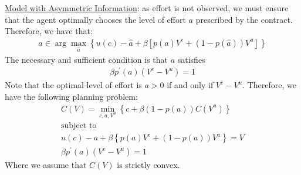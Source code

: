 \documentclass{article}
\begin{document}
\vspace{2.5mm}
\par \underline{Model with Asymmetric Information}: as effort is not observed, we must ensure that the agent optimally chooses the level of effort $a$ prescribed by the contract. Therefore, we have that:
\begin{gather*}
    a \in \arg \max_{\widehat{a}} \left\{ u(c) - \widehat{a} + \beta [p(\widehat{a})V^{e} + (1-p(\widehat{a}))V^{u}] \right\}
\end{gather*}
The necessary and sufficient condition is that $a$ satisfies
\begin{gather*}
    \beta p^{'}(a) (V^{e} - V^{u}) = 1
\end{gather*}
Note that the optimal level of effort is $a > 0$ if and only if $V^{e} - V^{u}$. Therefore, we have the following planning problem:
\begin{gather*}
    C(V) = \min_{c, a, V^{u}} \left\{ c + \beta (1 - p(a)) C(V^{u}) \right\} \\
    \text{subject to} \\
    u(c) - a + \beta \left\{ p(a)V^{e} + (1 - p(a))V^{u} \right\} = V \tag{PKC} \\
    \beta p^{'}(a) (V^{e} - V^{u}) = 1 \tag{IC}
\end{gather*}
Where we assume that $C(V)$ is strictly convex.
\end{document}
